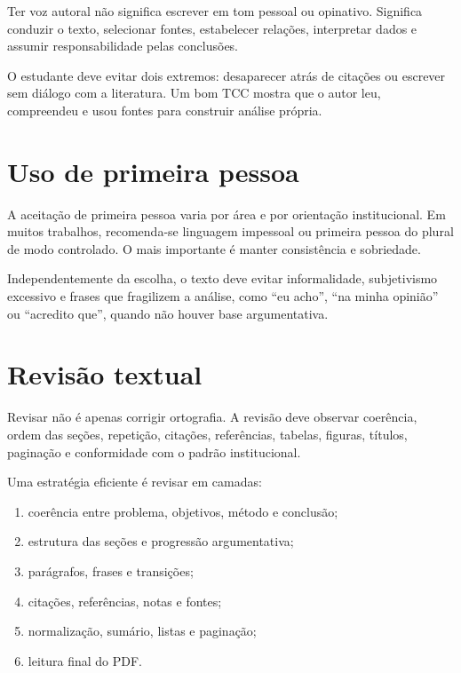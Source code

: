 Ter voz autoral não significa escrever em tom pessoal ou opinativo. Significa conduzir o texto, selecionar fontes, estabelecer relações, interpretar dados e assumir responsabilidade pelas conclusões.

O estudante deve evitar dois extremos: desaparecer atrás de citações ou escrever sem diálogo com a literatura. Um bom TCC mostra que o autor leu, compreendeu e usou fontes para construir análise própria.

\section{Uso de primeira pessoa}

A aceitação de primeira pessoa varia por área e por orientação institucional. Em muitos trabalhos, recomenda-se linguagem impessoal ou primeira pessoa do plural de modo controlado. O mais importante é manter consistência e sobriedade.

Independentemente da escolha, o texto deve evitar informalidade, subjetivismo excessivo e frases que fragilizem a análise, como ``eu acho'', ``na minha opinião'' ou ``acredito que'', quando não houver base argumentativa.

\section{Revisão textual}

Revisar não é apenas corrigir ortografia. A revisão deve observar coerência, ordem das seções, repetição, citações, referências, tabelas, figuras, títulos, paginação e conformidade com o padrão institucional.

Uma estratégia eficiente é revisar em camadas:

\begin{enumerate}
  \item coerência entre problema, objetivos, método e conclusão;
  \item estrutura das seções e progressão argumentativa;
  \item parágrafos, frases e transições;
  \item citações, referências, notas e fontes;
  \item normalização, sumário, listas e paginação;
  \item leitura final do PDF.
\end{enumerate}


